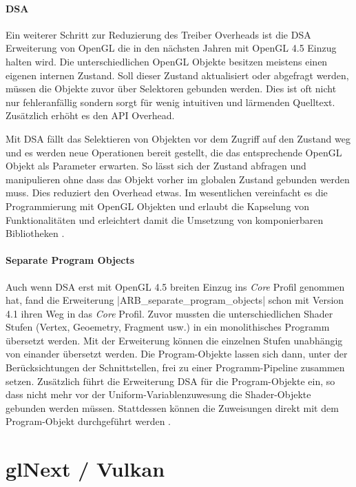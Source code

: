 \paragraph{\acl{DSA}} Ein weiterer Schritt zur Reduzierung des Treiber Overheads ist die \ac{DSA} Erweiterung von OpenGL \parencite{Killgard2014} die in den nächsten Jahren mit OpenGL 4.5 Einzug halten wird. Die unterschiedlichen OpenGL Objekte besitzen meistens einen eigenen internen Zustand. Soll dieser Zustand aktualisiert oder abgefragt werden, müssen die Objekte zuvor über Selektoren gebunden werden. Dies ist oft nicht nur fehleranfällig sondern sorgt für wenig intuitiven und lärmenden Quelltext. Zusätzlich erhöht es den API Overhead. 

Mit \ac{DSA} fällt das Selektieren von Objekten vor dem Zugriff auf den Zustand weg und es werden neue Operationen bereit gestellt, die das entsprechende OpenGL Objekt als Parameter erwarten. So lässt sich der Zustand abfragen und manipulieren ohne dass das Objekt vorher im globalen Zustand gebunden werden muss. Dies reduziert den Overhead etwas. Im wesentlichen vereinfacht es die Programmierung mit OpenGL Objekten und erlaubt die Kapselung von Funktionalitäten und erleichtert damit die Umsetzung von komponierbaren Bibliotheken .

\paragraph{Separate Program Objects} Auch wenn \ac{DSA} erst mit OpenGL 4.5 breiten Einzug ins \textit{Core} Profil genommen hat, fand die Erweiterung |ARB_separate_program_objects| \parencite{Killgard2011} schon mit Version 4.1 ihren Weg in das \textit{Core} Profil. Zuvor mussten die unterschiedlichen Shader Stufen (Vertex, Geoemetry, Fragment usw.) in ein monolithisches Programm übersetzt werden. Mit der Erweiterung können die einzelnen Stufen unabhängig von einander übersetzt werden. Die Program-Objekte lassen sich dann, unter der Berücksichtungen der Schnittstellen, frei zu einer Programm-Pipeline zusammen setzen. Zusätzlich führt die Erweiterung \ac{DSA} für die Program-Objekte ein, so dass nicht mehr vor der Uniform-Variablenzuwesung die Shader-Objekte gebunden werden müssen. Stattdessen können die Zuweisungen direkt mit dem Program-Objekt durchgeführt werden .



\section{glNext / Vulkan}
\cite{gamedevnet:glnext}

